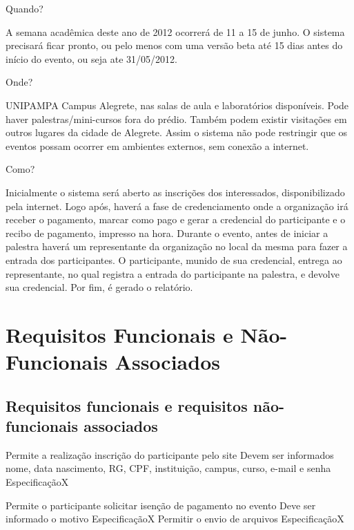 \documentclass[12pt,a4paper]{article}
\begin{document}
\begin{onehalfspace}
        Quando?
        
        A semana acadêmica deste ano de 2012 ocorrerá de 11 a 15 de junho. O sistema precisará ficar pronto, ou pelo menos com uma versão beta até 15 dias antes do início do evento, ou seja ate 31/05/2012.
        
        Onde?
        
        UNIPAMPA Campus Alegrete, nas salas de aula e laboratórios disponíveis. Pode haver palestras/mini-cursos fora do prédio. Também podem existir visitações em outros lugares da cidade de Alegrete. Assim o sistema não pode restringir que os eventos possam ocorrer em ambientes externos, sem conexão a internet.
        
        Como?
        
        Inicialmente o sistema será aberto as inscrições dos interessados, disponibilizado pela internet. Logo após, haverá a fase de credenciamento onde a organização irá receber o pagamento, marcar como pago e gerar a credencial do participante e o recibo de pagamento, impresso na hora. Durante o evento, antes de iniciar a palestra haverá um representante da organização no local da mesma para fazer a entrada dos participantes. O participante, munido de sua credencial, entrega ao representante, no qual registra a entrada do participante na palestra, e devolve sua credencial. Por fim, é gerado o relatório.
        \end{onehalfspace}
        \clearpage
        \section{Requisitos Funcionais e Não-Funcionais Associados}
        
        	\subsection{Requisitos funcionais e requisitos não-funcionais associados}
        

		\setcounter{NumberReqF}{0}
		\setcounter{NumberReqNF}{0}
        	
        	{Permite a realização inscrição do participante pelo site}
        	{%
	        	  {Devem ser informados nome, data nascimento, RG, CPF, instituição, campus, curso, e-mail e senha}
	        	  {Especificação}{}{X}%
        	}
        	
        	{Permite o participante solicitar isenção de pagamento no evento}
        	{%
	        	  {Deve ser informado o motivo}
	        	  {Especificação}{}{X}%
	        	  {Permitir o envio de arquivos}
	        	  {Especificação}{}{X}%
        	}
        	
\end{document}
